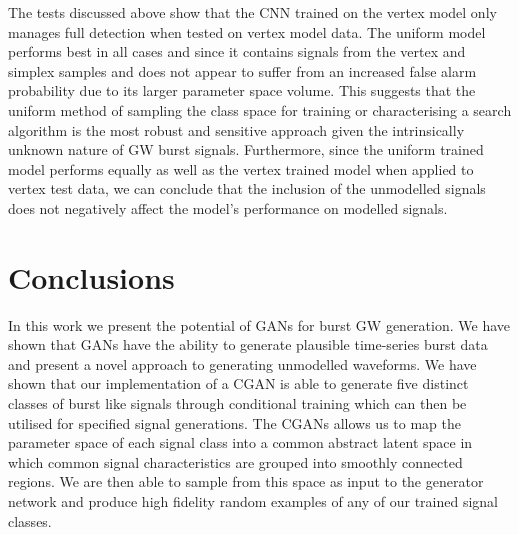 \documentclass[12pt]{iopart}
\begin{document}
%
The tests discussed above show that the \ac{CNN} trained on the vertex model only manages full detection when tested on vertex model data. The uniform model performs best in all cases and since it contains signals from the vertex and simplex samples and does not appear to suffer from an increased false alarm probability due to its larger parameter space volume. This suggests that the uniform method of sampling the class space for training or characterising a search algorithm is the most robust and sensitive approach given the intrinsically unknown nature of GW burst signals. Furthermore, since the uniform trained model performs equally as well as the vertex trained model when applied to  vertex test data, we can conclude that the inclusion of the unmodelled signals does not negatively affect the model's performance on modelled signals.

\section{Conclusions}\label{conclusions}

%
%
In this work we present the potential of \acp{GAN} for
burst GW generation. We have shown that \acp{GAN} have the ability to generate plausible time-series burst data and present a novel approach to generating unmodelled waveforms. We have shown that our implementation of a \ac{CGAN} is able to generate five distinct classes of burst like signals through conditional training which can then be utilised for specified signal generations. The \acp{CGAN} allows us to map the parameter space of each signal class into a common abstract latent space in which common signal characteristics are grouped into smoothly connected regions. We are then able to sample from this space as input to the generator network and produce high fidelity random examples of any of our trained signal classes.      
\end{document}
